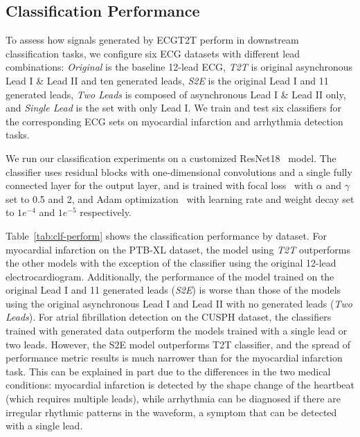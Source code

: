 \subsection{Classification Performance}

To assess how signals generated by ECGT2T perform in downstream classification tasks, we configure six ECG datasets with different lead combinations: \textit{Original} is the baseline 12-lead ECG, \textit{T2T} is original asynchronous Lead I \& Lead II and ten generated leads, \textit{S2E} is the original Lead I and 11 generated leads, \textit{Two Leads} is composed of asynchronous Lead I \& Lead II only, and \textit{Single Lead} is the set with only Lead I. We train and test six classifiers for the corresponding ECG sets on myocardial infarction and arrhythmia detection tasks. 

We run our classification experiments on a customized ResNet18~\cite{he16} model. The classifier uses residual blocks with one-dimensional convolutions and a single fully connected layer for the output layer, and is trained with focal loss~\cite{lin17} with $\alpha$ and $\gamma$ set to 0.5 and 2, and Adam optimization~\cite{kin14} with learning rate and weight decay set to $1e^{-4}$ and $1e^{-5}$ respectively.


Table~\ref{tab:clf-perform} shows the classification performance by dataset. For myocardial infarction on the PTB-XL dataset, the model using \textit{T2T} outperforms the other models with the exception of the classifier using the original 12-lead electrocardiogram. Additionally, the performance of the model trained on the original Lead I and 11 generated leads (\textit{S2E}) is worse than those of the models using the original asynchronous Lead I and Lead II with no generated leads (\textit{Two Leads}). For atrial fibrillation detection on the CUSPH dataset, the classifiers trained with generated data outperform the models trained with a single lead or two leads. However, the S2E model outperforms T2T classifier, and the spread of performance metric results is much narrower than for the myocardial infarction task. This can be explained in part due to the differences in the two medical conditions: myocardial infarction is detected by the shape change of the heartbeat (which requires multiple leads), while arrhythmia can be diagnosed if there are irregular rhythmic patterns in the waveform, a symptom that can be detected with a single lead.


